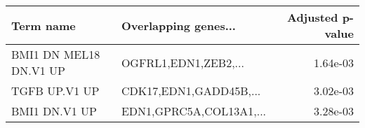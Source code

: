 \begin{tabular}{llr}
\toprule
             Term name &    Overlapping genes... &  Adjusted p-value \\
\midrule
BMI1 DN MEL18 DN.V1 UP &    OGFRL1,EDN1,ZEB2,... &          1.64e-03 \\
         TGFB UP.V1 UP &  CDK17,EDN1,GADD45B,... &          3.02e-03 \\
         BMI1 DN.V1 UP & EDN1,GPRC5A,COL13A1,... &          3.28e-03 \\
\bottomrule
\end{tabular}
